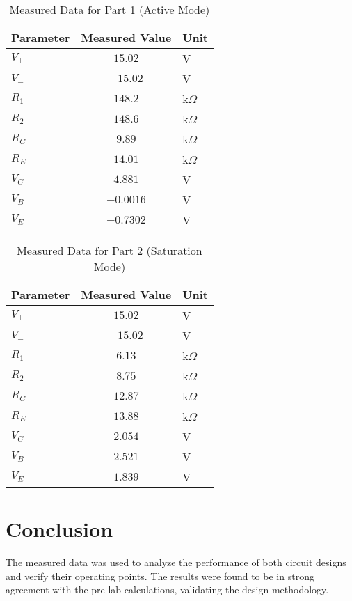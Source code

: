 \begin{table}[H]
\centering
\caption{Measured Data for Part 1 (Active Mode)}
\begin{tabular}{|l|c|l|}
\hline
\textbf{Parameter} & \textbf{Measured Value} & \textbf{Unit} \\ \hline
$V_+$ & $15.02$ & V \\ \hline
$V_-$ & $-15.02$ & V \\ \hline
$R_1$ & $148.2$ & k$\Omega$ \\ \hline
$R_2$ & $148.6$ & k$\Omega$ \\ \hline
$R_C$ & $9.89$ & k$\Omega$ \\ \hline
$R_E$ & $14.01$ & k$\Omega$ \\ \hline
$V_C$ & $4.881$ & V \\ \hline
$V_B$ & $-0.0016$ & V \\ \hline
$V_E$ & $-0.7302$ & V \\ \hline
\end{tabular}
\end{table}

\begin{table}[H]
\centering
\caption{Measured Data for Part 2 (Saturation Mode)}
\begin{tabular}{|l|c|l|}
\hline
\textbf{Parameter} & \textbf{Measured Value} & \textbf{Unit} \\ \hline
$V_+$ & $15.02$ & V \\ \hline
$V_-$ & $-15.02$ & V \\ \hline
$R_1$ & $6.13$ & k$\Omega$ \\ \hline
$R_2$ & $8.75$ & k$\Omega$ \\ \hline
$R_C$ & $12.87$ & k$\Omega$ \\ \hline
$R_E$ & $13.88$ & k$\Omega$ \\ \hline
$V_C$ & $2.054$ & V \\ \hline
$V_B$ & $2.521$ & V \\ \hline
$V_E$ & $1.839$ & V \\ \hline
\end{tabular}
\end{table}

\newpage
\section*{Conclusion}
The measured data was used to analyze the performance of both circuit designs and verify their operating points. The results were found to be in strong agreement with the pre-lab calculations, validating the design methodology.

